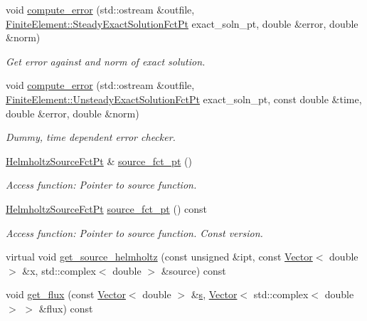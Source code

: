 \begin{DoxyCompactItemize}
void \hyperlink{classoomph_1_1HelmholtzEquations_a962321f7f6f5925e8f108b5d48f98da2}{compute\+\_\+error} (std\+::ostream \&outfile, \hyperlink{classoomph_1_1FiniteElement_a690fd33af26cc3e84f39bba6d5a85202}{Finite\+Element\+::\+Steady\+Exact\+Solution\+Fct\+Pt} exact\+\_\+soln\+\_\+pt, double \&error, double \&norm)
\begin{DoxyCompactList}\small\item\em Get error against and norm of exact solution. \end{DoxyCompactList}\item 
void \hyperlink{classoomph_1_1HelmholtzEquations_ab54feaaaca82a4cf112da74386fe713f}{compute\+\_\+error} (std\+::ostream \&outfile, \hyperlink{classoomph_1_1FiniteElement_ad4ecf2b61b158a4b4d351a60d23c633e}{Finite\+Element\+::\+Unsteady\+Exact\+Solution\+Fct\+Pt} exact\+\_\+soln\+\_\+pt, const double \&time, double \&error, double \&norm)
\begin{DoxyCompactList}\small\item\em Dummy, time dependent error checker. \end{DoxyCompactList}\item 
\hyperlink{classoomph_1_1HelmholtzEquations_a630648023d91bba9ee9a900353a1ea58}{Helmholtz\+Source\+Fct\+Pt} \& \hyperlink{classoomph_1_1HelmholtzEquations_a0889bb08c9279e7ab69cfd6ae2ff20d7}{source\+\_\+fct\+\_\+pt} ()
\begin{DoxyCompactList}\small\item\em Access function\+: Pointer to source function. \end{DoxyCompactList}\item 
\hyperlink{classoomph_1_1HelmholtzEquations_a630648023d91bba9ee9a900353a1ea58}{Helmholtz\+Source\+Fct\+Pt} \hyperlink{classoomph_1_1HelmholtzEquations_af8127c995ddc0b8dbc29ed413f2eb7b2}{source\+\_\+fct\+\_\+pt} () const
\begin{DoxyCompactList}\small\item\em Access function\+: Pointer to source function. Const version. \end{DoxyCompactList}\item 
virtual void \hyperlink{classoomph_1_1HelmholtzEquations_a6a65cb36cbb2d273a5cfe2a8f73e9604}{get\+\_\+source\+\_\+helmholtz} (const unsigned \&ipt, const \hyperlink{classoomph_1_1Vector}{Vector}$<$ double $>$ \&x, std\+::complex$<$ double $>$ \&source) const
\item 
void \hyperlink{classoomph_1_1HelmholtzEquations_a5a572831004e521f58d5a54c8392262f}{get\+\_\+flux} (const \hyperlink{classoomph_1_1Vector}{Vector}$<$ double $>$ \&\hyperlink{cfortran_8h_ab7123126e4885ef647dd9c6e3807a21c}{s}, \hyperlink{classoomph_1_1Vector}{Vector}$<$ std\+::complex$<$ double $>$ $>$ \&flux) const

\end{DoxyCompactItemize}
